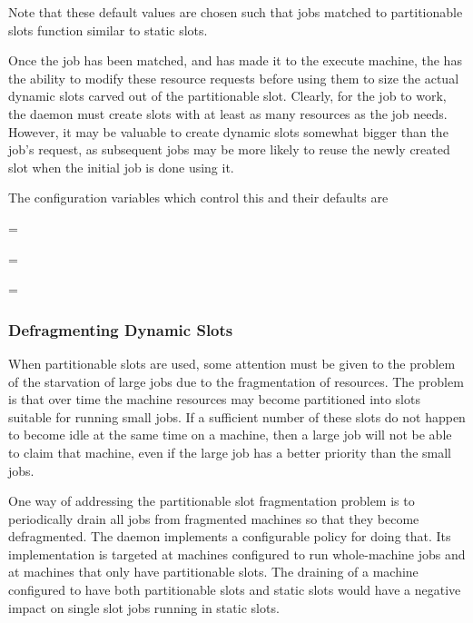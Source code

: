 Note that these default values are chosen such that 
jobs matched to partitionable slots function similar to static slots.

Once the job has been matched, 
and has made it to the execute machine, 
the  has the ability to modify these 
resource requests before using them to size the
actual dynamic slots carved out of the partitionable slot.  
Clearly, for the job to work,
the  daemon must create slots with at least 
as many resources as the job needs.  
However,
it may be valuable to create dynamic slots somewhat bigger 
than the job's request, 
as subsequent jobs may be more likely to reuse the newly created slot 
when the initial job is done using it.

The  configuration variables which control this 
and their defaults are

\begin{description}
  \item{ = }
  \item{ = }
  \item{ = }
\end{description}

\subsubsection{\label{sec:SMP-defrag}
Defragmenting Dynamic Slots}

When partitionable slots are used, some attention must be given to the
problem of the starvation of large jobs due to the fragmentation of resources.
The problem is that over time the machine resources may become
partitioned into slots suitable for running small jobs.
If a sufficient number of these slots do not happen to become idle at the
same time on a machine, then a large job will not be able to claim that
machine, even if the large job has a better priority than the small jobs.

One way of addressing the partitionable slot fragmentation problem is
to periodically drain all jobs from fragmented machines so that they
become defragmented.  
The  daemon implements a configurable policy for doing that.
Its implementation is targeted at machines configured to run whole-machine
jobs and at machines that only have partitionable slots.
The draining of a machine 
configured to have both partitionable slots and static slots 
would have a negative impact on single slot jobs running in static slots.

